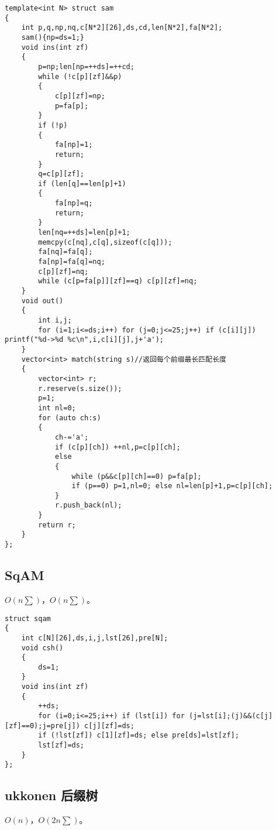 \documentclass[12pt]{ctexart}
\begin{document}
\begin{lstlisting}
template<int N> struct sam
{
	int p,q,np,nq,c[N*2][26],ds,cd,len[N*2],fa[N*2];
	sam(){np=ds=1;}
	void ins(int zf)
	{
		p=np;len[np=++ds]=++cd;
		while (!c[p][zf]&&p)
		{
			c[p][zf]=np;
			p=fa[p];
		}
		if (!p)
		{
			fa[np]=1;
			return;
		}
		q=c[p][zf];
		if (len[q]==len[p]+1)
		{
			fa[np]=q;
			return;
		}
		len[nq=++ds]=len[p]+1;
		memcpy(c[nq],c[q],sizeof(c[q]));
		fa[nq]=fa[q];
		fa[np]=fa[q]=nq;
		c[p][zf]=nq;
		while (c[p=fa[p]][zf]==q) c[p][zf]=nq;
	}
	void out()
	{
		int i,j;
		for (i=1;i<=ds;i++) for (j=0;j<=25;j++) if (c[i][j]) printf("%d->%d %c\n",i,c[i][j],j+'a');
	}
	vector<int> match(string s)//返回每个前缀最长匹配长度
	{
		vector<int> r;
		r.reserve(s.size());
		p=1;
		int nl=0;
		for (auto ch:s)
		{
			ch-='a';
			if (c[p][ch]) ++nl,p=c[p][ch];
			else
			{
				while (p&&c[p][ch]==0) p=fa[p];
				if (p==0) p=1,nl=0; else nl=len[p]+1,p=c[p][ch];
			}
			r.push_back(nl);
		}
		return r;
	}
};
\end{lstlisting}

\subsection{SqAM}

$O(n\sum)$，$O(n\sum )$。

\begin{lstlisting}
struct sqam
{
	int c[N][26],ds,i,j,lst[26],pre[N];
	void csh()
	{
		ds=1;
	}
	void ins(int zf)
	{
		++ds;
		for (i=0;i<=25;i++) if (lst[i]) for (j=lst[i];(j)&&(c[j][zf]==0);j=pre[j]) c[j][zf]=ds;
		if (!lst[zf]) c[1][zf]=ds; else pre[ds]=lst[zf];
		lst[zf]=ds;
	}
};
\end{lstlisting}

\subsection{ukkonen 后缀树}

$O(n)$，$O(2n\sum )$。
\end{document}
